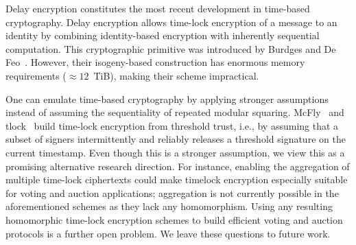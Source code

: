 Delay encryption constitutes the most recent development in time-based cryptography. Delay encryption allows time-lock encryption of a message to an identity by combining identity-based encryption with inherently sequential computation. This cryptographic primitive was introduced by Burdges and De Feo~\cite{EC:BurDeF21}. However, their isogeny-based construction has enormous memory requirements ($\approx 12$\ TiB), making their scheme impractical.

One can emulate time-based cryptography by applying stronger assumptions instead of assuming the sequentiality of repeated modular squaring. McFly~\cite{FC:DHMW23} and tlock~\cite{EPRINT:GaiMelRom23} build time-lock encryption from threshold trust, i.e., by assuming that a subset of signers intermittently and reliably releases a threshold signature on the current timestamp. Even though this is a stronger assumption, we view this as a promising alternative research direction. For instance, enabling the aggregation of multiple time-lock ciphertexts could make timelock encryption especially suitable for voting and auction applications; aggregation is not currently possible in the aforementioned schemes as they lack any homomorphism. 
Using any resulting homomorphic time-lock encryption schemes to build efficient voting and auction protocols is a further open problem.
We leave these questions to future work. 



